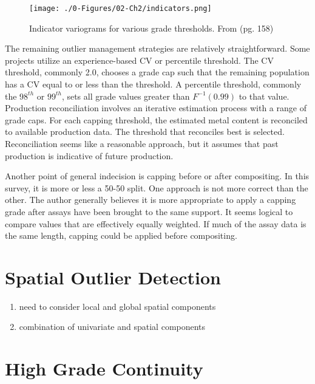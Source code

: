 \begin{figure}[htb!]
    \centering
    \texttt{[image: ./0-Figures/02-Ch2/indicators.png]}
    \caption{Indicator variograms for various grade thresholds. From \cite{osiko2020} (pg. 158)}
    \label{fig:indicators}
\end{figure}

The remaining outlier management strategies are relatively straightforward. Some projects utilize an experience-based CV or percentile threshold. The CV threshold, commonly 2.0, chooses a grade cap such that the remaining population has a CV equal to or less than the threshold. A percentile threshold, commonly the $98^{th}$ or $99^{th}$, sets all grade values greater than $F^{-1}(0.99)$ to that value. Production reconciliation involves an iterative estimation process with a range of grade caps. For each capping threshold, the estimated metal content is reconciled to available production data. The threshold that reconciles best is selected. Reconciliation seems like a reasonable approach, but it assumes that past production is indicative of future production.

Another point of general indecision is capping before or after compositing. In this survey, it is more or less a 50-50 split. One approach is not more correct than the other. The author generally believes it is more appropriate to apply a capping grade after assays have been brought to the same support. It seems logical to compare values that are effectively equally weighted. If much of the assay data is the same length, capping could be applied before compositing.

\FloatBarrier
\section{Spatial Outlier Detection}
\label{sec:02spatial}

\begin{enumerate}
    \item need to consider local and global spatial components
    \item combination of univariate and spatial components
\end{enumerate}


\FloatBarrier
\section{High Grade Continuity}
\label{sec:02continuity}


